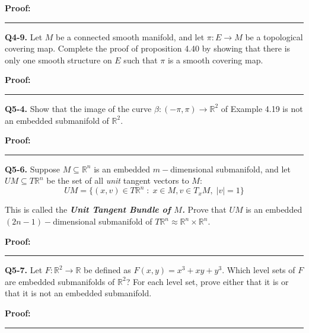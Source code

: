 \documentclass{article}
\newcommand{\R}{\mathbb{R}}
\begin{document}
\vskip 0.5cm
\textbf{Proof:}


\vskip 0.5cm
\hrule 
\vskip 0.5cm




\textbf{Q4-9.} Let $M$ be a connected smooth manifold, and let $\pi : E \rightarrow M$ be a topological covering map. Complete the proof of proposition 4.40 by showing that there is only one smooth structure on $E$ such that $\pi$ is a smooth covering map.  

\vskip 0.5cm
\textbf{Proof:}


\vskip 0.5cm
\hrule 
\vskip 0.5cm




\textbf{Q5-4.} Show that the image of the curve $\beta : (-\pi, \pi) \rightarrow \R^2$ of Example 4.19 is not an embedded submanifold of $\R^2$. 

\vskip 0.5cm
\textbf{Proof:}


\vskip 0.5cm
\hrule 
\vskip 0.5cm




\textbf{Q5-6.} Suppose $M \subseteq \R^n$ is an embedded $m-$dimensional submanifold, and let $UM \subseteq T \R^n$ be the set of all \emph{unit} tangent vectors to $M$:
\[ UM = \{ (x, v) \in T \R^n \; : \; x\in M, v \in T_{x} M, \; \left| v \right| = 1 \} \]

This is called the \emph{\textbf{Unit Tangent Bundle of $M$.}} Prove that $UM$ is an embedded  $(2n-1)-$dimensional submanifold of $T \R^n \approx \R^n \times \R^{n}$.

\vskip 0.5cm
\textbf{Proof:}


\vskip 0.5cm
\hrule 
\vskip 0.5cm




\textbf{Q5-7.} Let $F : \R^2 \rightarrow \R$ be defined as $F(x,y) = x^3 + xy + y^3$. Which level sets of $F$ are embedded submanifolds of $\R^2$? For each level set, prove either that it is or that it is not an embedded submanifold. 

\vskip 0.5cm
\textbf{Proof:}


\vskip 0.5cm
\hrule 
\vskip 0.5cm









\end{document}
